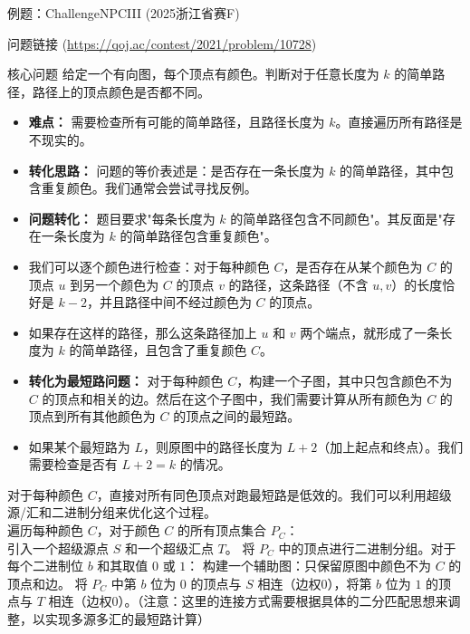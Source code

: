 \documentclass[11pt]{beamer}
\begin{document}
\begin{frame}
    例题：ChallengeNPCIII (2025浙江省赛F)
    \begin{block}{问题链接}
        (\url{https://qoj.ac/contest/2021/problem/10728})
    \end{block}
    \begin{block}{核心问题}
        给定一个有向图，每个顶点有颜色。判断对于任意长度为 $k$ 的简单路径，路径上的顶点颜色是否都不同。
    \end{block}
    \begin{itemize}
        \item \textbf{难点：} 需要检查所有可能的简单路径，且路径长度为 $k$。直接遍历所有路径是不现实的。
        \item \textbf{转化思路：} 问题的等价表述是：是否存在一条长度为 $k$ 的简单路径，其中包含重复颜色。我们通常会尝试寻找反例。
    \end{itemize}
\end{frame}

\begin{frame}
    \begin{itemize}
        \item \textbf{问题转化：} 题目要求"每条长度为 $k$ 的简单路径包含不同颜色"。其反面是"存在一条长度为 $k$ 的简单路径包含重复颜色"。
        \item 我们可以逐个颜色进行检查：对于每种颜色 $C$，是否存在从某个颜色为 $C$ 的顶点 $u$ 到另一个颜色为 $C$ 的顶点 $v$ 的路径，这条路径（不含 $u, v$）的长度恰好是 $k-2$，并且路径中间不经过颜色为 $C$ 的顶点。
        \item 如果存在这样的路径，那么这条路径加上 $u$ 和 $v$ 两个端点，就形成了一条长度为 $k$ 的简单路径，且包含了重复颜色 $C$。
        \item \textbf{转化为最短路问题：} 对于每种颜色 $C$，构建一个子图，其中只包含颜色不为 $C$ 的顶点和相关的边。然后在这个子图中，我们需要计算从所有颜色为 $C$ 的顶点到所有其他颜色为 $C$ 的顶点之间的最短路。
        \item 如果某个最短路为 $L$，则原图中的路径长度为 $L+2$（加上起点和终点）。我们需要检查是否有 $L+2 = k$ 的情况。
    \end{itemize}
\end{frame}

\begin{frame}
    对于每种颜色 $C$，直接对所有同色顶点对跑最短路是低效的。我们可以利用超级源/汇和二进制分组来优化这个过程。\\
    遍历每种颜色 $C$，对于颜色 $C$ 的所有顶点集合 $P_C$：\\
    引入一个超级源点 $S$ 和一个超级汇点 $T$。
    将 $P_C$ 中的顶点进行二进制分组。对于每个二进制位 $b$ 和其取值 $0$ 或 $1$：
    构建一个辅助图：只保留原图中颜色不为 $C$ 的顶点和边。
    将 $P_C$ 中第 $b$ 位为 $0$ 的顶点与 $S$ 相连（边权0），将第 $b$ 位为 $1$ 的顶点与 $T$ 相连（边权0）。（注意：这里的连接方式需要根据具体的二分匹配思想来调整，以实现多源多汇的最短路计算）
\end{frame}
\end{document}
